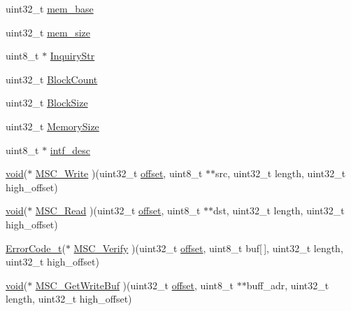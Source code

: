 \begin{DoxyCompactItemize}
\item 
uint32\-\_\-t \hyperlink{structUSBD__MSC__INIT__PARAM_a1ab6b66d44ad7db8c2ded5e2f4200aae}{mem\-\_\-base}
\item 
uint32\-\_\-t \hyperlink{structUSBD__MSC__INIT__PARAM_a33048544944f306ae198de18468309b4}{mem\-\_\-size}
\item 
uint8\-\_\-t $\ast$ \hyperlink{structUSBD__MSC__INIT__PARAM_a84e110f5e1d448f9c35e9e8583429df8}{Inquiry\-Str}
\item 
uint32\-\_\-t \hyperlink{structUSBD__MSC__INIT__PARAM_a88951ad7bc026318e18eadf372804caa}{Block\-Count}
\item 
uint32\-\_\-t \hyperlink{structUSBD__MSC__INIT__PARAM_af0ed8a5b4aec5f19e1b15c1ab3c3dcbd}{Block\-Size}
\item 
uint32\-\_\-t \hyperlink{structUSBD__MSC__INIT__PARAM_af5cecd156943a33ccaa619ea8a9d596d}{Memory\-Size}
\item 
uint8\-\_\-t $\ast$ \hyperlink{structUSBD__MSC__INIT__PARAM_a308fc23cd32876dcdc914d2223f8f7c4}{intf\-\_\-desc}
\item 
\hyperlink{Paradigm_2Tern__EE_2small_2portmacro_8h_a14d32f8130d3c0b212cfc751730b5b49}{void}($\ast$ \hyperlink{structUSBD__MSC__INIT__PARAM_a59e033b46bc3b36af7be6bc9da697a5f}{M\-S\-C\-\_\-\-Write} )(uint32\-\_\-t \hyperlink{MPLAB_2PIC32MZ_2ISR__Support_8h_ac0542d92dfcd62c19170fd963f9e5052}{offset}, uint8\-\_\-t $\ast$$\ast$src, uint32\-\_\-t length, uint32\-\_\-t high\-\_\-offset)
\item 
\hyperlink{Paradigm_2Tern__EE_2small_2portmacro_8h_a14d32f8130d3c0b212cfc751730b5b49}{void}($\ast$ \hyperlink{structUSBD__MSC__INIT__PARAM_a1cd64cf7afe0b77e5d9c5be3f5e02596}{M\-S\-C\-\_\-\-Read} )(uint32\-\_\-t \hyperlink{MPLAB_2PIC32MZ_2ISR__Support_8h_ac0542d92dfcd62c19170fd963f9e5052}{offset}, uint8\-\_\-t $\ast$$\ast$dst, uint32\-\_\-t length, uint32\-\_\-t high\-\_\-offset)
\item 
\hyperlink{error_8h_a905255056c349318139d94aa4523d516}{Error\-Code\-\_\-t}($\ast$ \hyperlink{structUSBD__MSC__INIT__PARAM_a4683f34508ac7e6515a1284d4c1ccfe1}{M\-S\-C\-\_\-\-Verify} )(uint32\-\_\-t \hyperlink{MPLAB_2PIC32MZ_2ISR__Support_8h_ac0542d92dfcd62c19170fd963f9e5052}{offset}, uint8\-\_\-t buf\mbox{[}$\,$\mbox{]}, uint32\-\_\-t length, uint32\-\_\-t high\-\_\-offset)
\item 
\hyperlink{Paradigm_2Tern__EE_2small_2portmacro_8h_a14d32f8130d3c0b212cfc751730b5b49}{void}($\ast$ \hyperlink{structUSBD__MSC__INIT__PARAM_aae84c91a14ee8c3e1c7d39a2d626ab60}{M\-S\-C\-\_\-\-Get\-Write\-Buf} )(uint32\-\_\-t \hyperlink{MPLAB_2PIC32MZ_2ISR__Support_8h_ac0542d92dfcd62c19170fd963f9e5052}{offset}, uint8\-\_\-t $\ast$$\ast$buff\-\_\-adr, uint32\-\_\-t length, uint32\-\_\-t high\-\_\-offset)
$$
\end{DoxyCompactItemize}

